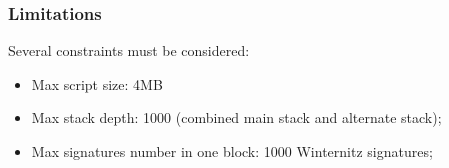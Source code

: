 \subsubsection{Limitations}

Several constraints must be considered:
\begin{itemize}
    \item Max script size: 4MB
    \item Max stack depth: 1000 (combined main stack and alternate stack);
    \item Max signatures number in one block: 1000 Winternitz signatures;
\end{itemize}
